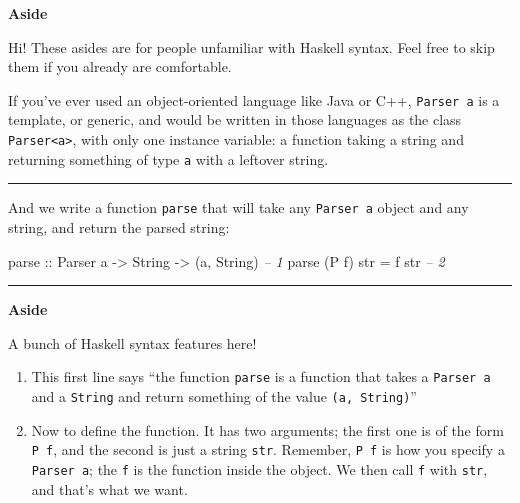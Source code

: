 \documentclass[]{article}
\newenvironment{Shaded}{}{}
\newcommand{\DataTypeTok}[1]{\textcolor[rgb]{0.56,0.13,0.00}{{#1}}}
\newcommand{\CommentTok}[1]{\textcolor[rgb]{0.38,0.63,0.69}{\textit{{#1}}}}
\newcommand{\OtherTok}[1]{\textcolor[rgb]{0.00,0.44,0.13}{{#1}}}
\newcommand{\FunctionTok}[1]{\textcolor[rgb]{0.02,0.16,0.49}{{#1}}}
\newcommand{\NormalTok}[1]{{#1}}
\begin{document}
\textbf{Aside}

Hi! These asides are for people unfamiliar with Haskell syntax. Feel free to
skip them if you already are comfortable.

If you've ever used an object-oriented language like Java or C++,
\texttt{Parser\ a} is a template, or generic, and would be written in those
languages as the class \texttt{Parser\textless{}a\textgreater{}}, with only one
instance variable: a function taking a string and returning something of type
\texttt{a} with a leftover string.

\begin{center}\rule{0.5\linewidth}{\linethickness}\end{center}

And we write a function \texttt{parse} that will take any \texttt{Parser\ a}
object and any string, and return the parsed string:

\begin{Shaded}
\begin{Highlighting}[]
\OtherTok{parse ::} \DataTypeTok{Parser} \NormalTok{a }\OtherTok{->} \DataTypeTok{String} \OtherTok{->} \NormalTok{(a, }\DataTypeTok{String}\NormalTok{)              }\CommentTok{-- 1}
\NormalTok{parse (}\DataTypeTok{P} \NormalTok{f) str }\FunctionTok{=} \NormalTok{f str                                 }\CommentTok{-- 2}
\end{Highlighting}
\end{Shaded}

\begin{center}\rule{0.5\linewidth}{\linethickness}\end{center}

\textbf{Aside}

A bunch of Haskell syntax features here!

\begin{enumerate}
\def\labelenumi{\arabic{enumi}.}
\item
  This first line says ``the function \texttt{parse} is a function that takes a
  \texttt{Parser\ a} and a \texttt{String} and return something of the value
  \texttt{(a,\ String)}''
\item
  Now to define the function. It has two arguments; the first one is of the form
  \texttt{P\ f}, and the second is just a string \texttt{str}. Remember,
  \texttt{P\ f} is how you specify a \texttt{Parser\ a}; the \texttt{f} is the
  function inside the object. We then call \texttt{f} with \texttt{str}, and
  that's what we want.
\end{enumerate}
\end{document}
